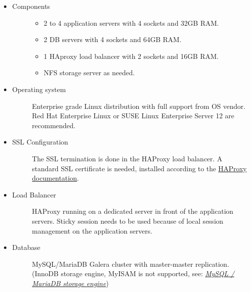 \documentclass[letterpaper,10pt,english]{sphinxmanual}
\begin{document}
\begin{itemize}
\item {} \begin{description}
\item[{Components}] \leavevmode\begin{itemize}
\item {} 
2 to 4 application servers with 4 sockets and 32GB RAM.

\item {} 
2 DB servers with 4 sockets and 64GB RAM.

\item {} 
1 HAproxy load balancer with 2 sockets and 16GB RAM.

\item {} 
NFS storage server as needed.

\end{itemize}

\end{description}

\item {} \begin{description}
\item[{Operating system}] \leavevmode
Enterprise grade Linux distribution with full support from OS vendor. Red
Hat Enterprise Linux or SUSE Linux Enterprise Server 12 are recommended.

\end{description}

\item {} \begin{description}
\item[{SSL Configuration}] \leavevmode
The SSL termination is done in the HAProxy load balancer. A standard SSL
certificate is needed, installed according to the \href{http://www.haproxy.org/\#docs}{HAProxy documentation}.

\end{description}

\item {} \begin{description}
\item[{Load Balancer}] \leavevmode
HAProxy running on a dedicated server in front of the application servers.
Sticky session needs to be used because of local session management on the
application servers.

\end{description}

\item {} \begin{description}
\item[{Database}] \leavevmode
MySQL/MariaDB Galera cluster with master-master replication. (InnoDB storage engine, MyISAM is not supported, see: {\hyperref[configuration_database/linux_database_configuration:db-storage-engine-label]{\emph{MySQL / MariaDB storage engine}}})


\end{description}
\end{itemize}
\end{document}
